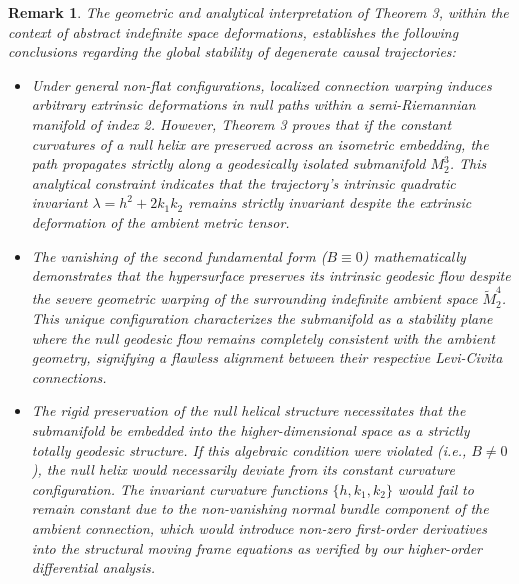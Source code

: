 \documentclass [reqno]{amsart}
\theoremstyle{plain}
\newtheorem{remark}{Remark}
\numberwithin{equation}{section}
\begin{document}
\begin{remark}
The geometric and analytical interpretation of Theorem 3, within the context of abstract indefinite space deformations, establishes the following conclusions regarding the global stability of degenerate causal trajectories:
\begin{itemize}
    \item Under general non-flat configurations, localized connection warping induces arbitrary extrinsic deformations in null paths within a semi-Riemannian manifold of index 2. However, Theorem 3 proves that if the constant curvatures of a null helix are preserved across an isometric embedding, the path propagates strictly along a geodesically isolated submanifold $M_2^3$. This analytical constraint indicates that the trajectory's intrinsic quadratic invariant $\lambda=h^2+2k_1 k_2$ remains strictly invariant despite the extrinsic deformation of the ambient metric tensor.
    \item The vanishing of the second fundamental form ($B\equiv 0$) mathematically demonstrates that the hypersurface preserves its intrinsic geodesic flow despite the severe geometric warping of the surrounding indefinite ambient space $\tilde{M}_2^4$. This unique configuration characterizes the submanifold as a stability plane where the null geodesic flow remains completely consistent with the ambient geometry, signifying a flawless alignment between their respective Levi-Civita connections.
    \item The rigid preservation of the null helical structure necessitates that the submanifold be embedded into the higher-dimensional space as a strictly totally geodesic structure. If this algebraic condition were violated (i.e., $B \neq 0$), the null helix would necessarily deviate from its constant curvature configuration. The invariant curvature functions $\{h,k_1,k_2\}$ would fail to remain constant due to the non-vanishing normal bundle component of the ambient connection, which would introduce non-zero first-order derivatives into the structural moving frame equations as verified by our higher-order differential analysis.
\end{itemize}
\end{remark}
\end{document}

